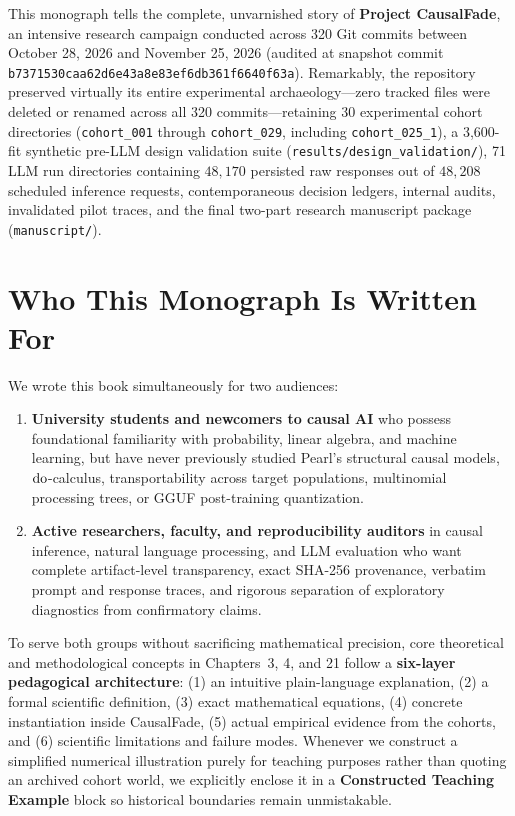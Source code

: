 This monograph tells the complete, unvarnished story of \textbf{Project CausalFade}, an intensive research campaign conducted across 320 Git commits between October 28, 2026 and November 25, 2026 (audited at snapshot commit \nolinkurl{b7371530caa62d6e43a8e83ef6db361f6640f63a}). Remarkably, the repository preserved virtually its entire experimental archaeology---zero tracked files were deleted or renamed across all 320 commits---retaining 30 experimental cohort directories (\texttt{cohort\_001} through \texttt{cohort\_029}, including \texttt{cohort\_025\_1}), a 3,600-fit synthetic pre-LLM design validation suite (\texttt{results/design\_validation/}), 71 LLM run directories containing $48{,}170$ persisted raw responses out of $48{,}208$ scheduled inference requests, contemporaneous decision ledgers, internal audits, invalidated pilot traces, and the final two-part research manuscript package (\texttt{manuscript/}).

\section*{Who This Monograph Is Written For}

We wrote this book simultaneously for two audiences:
\begin{enumerate}
  \item \textbf{University students and newcomers to causal AI} who possess foundational familiarity with probability, linear algebra, and machine learning, but have never previously studied Pearl's structural causal models, $\operatorname{do}$-calculus, transportability across target populations, multinomial processing trees, or GGUF post-training quantization.
  \item \textbf{Active researchers, faculty, and reproducibility auditors} in causal inference, natural language processing, and LLM evaluation who want complete artifact-level transparency, exact SHA-256 provenance, verbatim prompt and response traces, and rigorous separation of exploratory diagnostics from confirmatory claims.
\end{enumerate}

To serve both groups without sacrificing mathematical precision, core theoretical and methodological concepts in Chapters~3, 4, and 21 follow a \textbf{six-layer pedagogical architecture}: (1) an intuitive plain-language explanation, (2) a formal scientific definition, (3) exact mathematical equations, (4) concrete instantiation inside CausalFade, (5) actual empirical evidence from the cohorts, and (6) scientific limitations and failure modes. Whenever we construct a simplified numerical illustration purely for teaching purposes rather than quoting an archived cohort world, we explicitly enclose it in a \textbf{Constructed Teaching Example} block so historical boundaries remain unmistakable.

